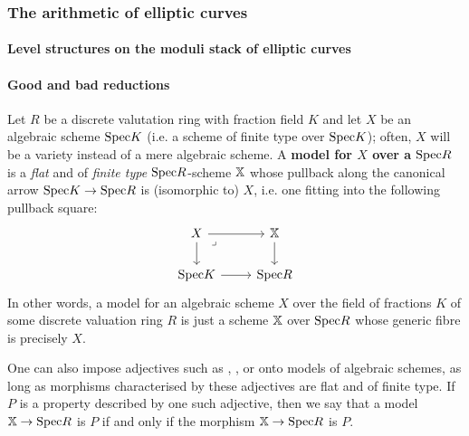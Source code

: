             \subsubsection{The arithmetic of elliptic curves}  
                \paragraph{Level structures on the moduli stack of elliptic curves}
            
                \paragraph{Good and bad reductions}
                    \begin{definition}[Models] \label{def: local_models_of_varieties} 
                        Let $R$ be a discrete valutation ring with fraction field $K$ and let $X$ be an algebraic scheme $\mathrm{Spec} K$ (i.e. a scheme of finite type over $\mathrm{Spec} K$); often, $X$ will be a variety instead of a mere algebraic scheme. A \textbf{model for $X$ over a $\mathrm{Spec} R$} is a \textit{flat} and of \textit{finite type} $\mathrm{Spec} R$-scheme $\mathbb{X}$ whose pullback along the canonical arrow $\mathrm{Spec} K \to \mathrm{Spec} R$ is (isomorphic to) $X$, i.e. one fitting into the following pullback square:
                            $$
                                \begin{tikzcd}
                                	X & \bbX \\
                                	{\Spec K} & {\Spec R}
                                	\arrow[from=1-1, to=2-1]
                                	\arrow[from=2-1, to=2-2]
                                	\arrow[from=1-2, to=2-2]
                                	\arrow[from=1-1, to=1-2]
                                	\arrow["\lrcorner"{anchor=center, pos=0.125}, draw=none, from=1-1, to=2-2]
                                \end{tikzcd}
                            $$
                        In other words, a model for an algebraic scheme $X$ over the field of fractions $K$ of some discrete valuation ring $R$ is just a scheme $\mathbb{X}$ over $\mathrm{Spec} R$ whose generic fibre is precisely $X$. 
                        
                        One can also impose adjectives such as , , or  onto models of algebraic schemes, as long as morphisms characterised by these adjectives are flat and of finite type. If $P$ is a property described by one such adjective, then we say that a model $\mathbb{X} \to \mathrm{Spec} R$ is $P$ if and only if the morphism $\mathbb{X} \to \mathrm{Spec} R$ is $P$.
                    \end{definition}
                
